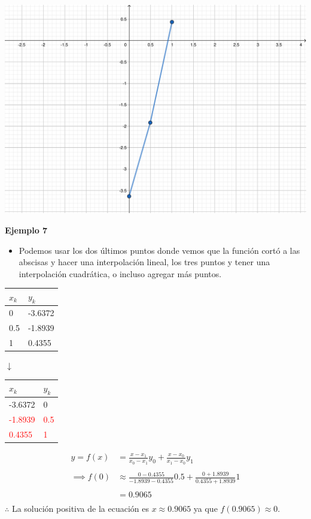 \documentclass[openany]{book}
\providecommand{\tightlist}{%
  \setlength{\itemsep}{0pt}\setlength{\parskip}{0pt}}
\begin{document}
\begin{center}\includegraphics[width=0.75\linewidth]{Plots/U4/lagr_ecuacion1} \end{center}

\textbf{Ejemplo 7}

\begin{itemize}
\tightlist
\item
  Podemos usar los dos últimos puntos donde vemos que la función cortó a las abscisas y hacer una interpolación lineal, los tres puntos y tener una interpolación cuadrática, o incluso agregar más puntos.
\end{itemize}

\begin{longtable}[]{@{}ll@{}}
\toprule
\(x_k\) & \(y_k\)\tabularnewline
\midrule
\endhead
0 & -3.6372\tabularnewline
0.5 & -1.8939\tabularnewline
1 & 0.4355\tabularnewline
\bottomrule
\end{longtable}

\(\downarrow\)

\begin{longtable}[]{@{}ll@{}}
\toprule
\(x_k\) & \(y_k\)\tabularnewline
\midrule
\endhead
-3.6372 & 0\tabularnewline
\textcolor{red}{-1.8939} & \textcolor{red}{0.5}\tabularnewline
\textcolor{red}{0.4355} & \textcolor{red}{1}\tabularnewline
\bottomrule
\end{longtable}

\[
\begin{split}
y = f(x) &= \frac{x - x_1}{x_0 - x_1} y_0 + \frac{x - x_0}{x_1 - x_0} y_1 \\ \\
\implies f(0) &\approx \frac{0-0.4355}{-1.8939-0.4355} 0.5 + \frac{0+1.8939}{0.4355+1.8939} 1 \\ \\
&= 0.9065 \\
\end{split}
\]
\(\therefore\) La solución positiva de la ecuación es \(x \approx 0.9065\) ya que \(f(0.9065) \approx 0\).
\end{document}
